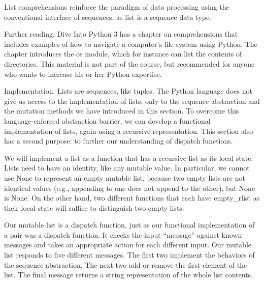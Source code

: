 \documentclass[letterpaper,10pt,dvipdfmx]{sphinxmanual}
\begin{document}
List comprehensions reinforce the paradigm of data processing using the conventional interface of sequences, as list is a sequence data type.

Further reading. Dive Into Python 3 has a chapter on comprehensions that includes examples of how to navigate a computer's file system using Python. The chapter introduces the os module, which for instance can list the contents of directories. This material is not part of the course, but recommended for anyone who wants to increase his or her Python expertise.

Implementation. Lists are sequences, like tuples. The Python language does not give us access to the implementation of lists, only to the sequence abstraction and the mutation methods we have introduced in this section. To overcome this language-enforced abstraction barrier, we can develop a functional implementation of lists, again using a recursive representation. This section also has a second purpose: to further our understanding of dispatch functions.

We will implement a list as a function that has a recursive list as its local state. Lists need to have an identity, like any mutable value. In particular, we cannot use None to represent an empty mutable list, because two empty lists are not identical values (e.g., appending to one does not append to the other), but None is None. On the other hand, two different functions that each have empty\_rlist as their local state will suffice to distinguish two empty lists.

Our mutable list is a dispatch function, just as our functional implementation of a pair was a dispatch function. It checks the input ``message'' against known messages and takes an appropriate action for each different input. Our mutable list responds to five different messages. The first two implement the behaviors of the sequence abstraction. The next two add or remove the first element of the list. The final message returns a string representation of the whole list contents.
\end{document}

